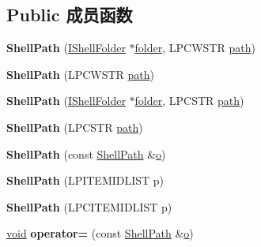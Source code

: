 \subsection*{Public 成员函数}
\begin{DoxyCompactItemize}
\item 
\mbox{\label{struct_shell_path_abfca6925236b152b61d9f91f64e95679}} 
{\bfseries Shell\+Path} (\hyperlink{interface_i_shell_folder}{I\+Shell\+Folder} $\ast$\hyperlink{structfolder}{folder}, L\+P\+C\+W\+S\+TR \hyperlink{structpath}{path})
\item 
\mbox{\label{struct_shell_path_a8a2a7d970dcb1d284da365702994ac12}} 
{\bfseries Shell\+Path} (L\+P\+C\+W\+S\+TR \hyperlink{structpath}{path})
\item 
\mbox{\label{struct_shell_path_a12ff8d4fe2cb72a762d860160be2102d}} 
{\bfseries Shell\+Path} (\hyperlink{interface_i_shell_folder}{I\+Shell\+Folder} $\ast$\hyperlink{structfolder}{folder}, L\+P\+C\+S\+TR \hyperlink{structpath}{path})
\item 
\mbox{\label{struct_shell_path_a8a60ed471db4a1373e89176849222a68}} 
{\bfseries Shell\+Path} (L\+P\+C\+S\+TR \hyperlink{structpath}{path})
\item 
\mbox{\label{struct_shell_path_aaa6ac1b98017aeedeb1570e00185ceb2}} 
{\bfseries Shell\+Path} (const \hyperlink{struct_shell_path}{Shell\+Path} \&\hyperlink{opengl_2mesa_2main_2extensions_8c_ac02068cf344ef10efe2778c164d1233e}{o})
\item 
\mbox{\label{struct_shell_path_aea99571069c1a7ed3e410593925238ec}} 
{\bfseries Shell\+Path} (L\+P\+I\+T\+E\+M\+I\+D\+L\+I\+ST p)
\item 
\mbox{\label{struct_shell_path_ad9a825589df02dfb0265e065af562b41}} 
{\bfseries Shell\+Path} (L\+P\+C\+I\+T\+E\+M\+I\+D\+L\+I\+ST p)
\item 
\mbox{\label{struct_shell_path_a2c89d54d0b2188df795828c242e46e48}} 
\hyperlink{interfacevoid}{void} {\bfseries operator=} (const \hyperlink{struct_shell_path}{Shell\+Path} \&\hyperlink{opengl_2mesa_2main_2extensions_8c_ac02068cf344ef10efe2778c164d1233e}{o})

\end{DoxyCompactItemize}
